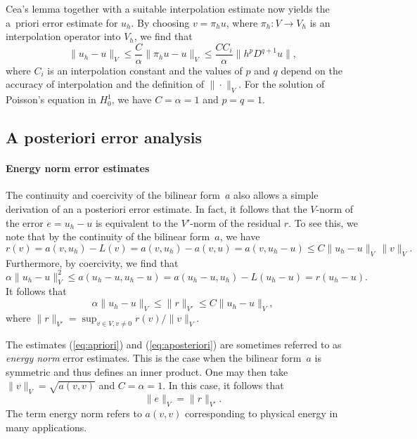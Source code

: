 Cea's lemma together with a suitable interpolation estimate now yields
the a~priori error estimate for $u_h$. By choosing $v = \pi_h u$,
where $\pi_h : V \rightarrow V_h$ is an interpolation operator into
$V_h$, we find that
\begin{equation} \label{eq:apriori}
  \|u_h - u\|_V
  \leq \frac{C}{\alpha} \|\pi_h u - u\|_V
  \leq \frac{C C_i}{\alpha} \|h^p D^{q + 1} u\|,
\end{equation}
where $C_i$ is an interpolation constant and the values of $p$ and $q$
depend on the accuracy of interpolation and the definition of
$\|\cdot\|_V$. For the solution of Poisson's equation in $H^1_0$, we
have $C = \alpha = 1$ and $p = q = 1$.

\subsection{A posteriori error analysis}

\paragraph{Energy norm error estimates}

The continuity and coercivity of the bilinear form~$a$ also allows a
simple derivation of an a posteriori error estimate.  In fact, it
follows that the $V$-norm of the error $e = u_h - u$ is equivalent to
the $V'$-norm of the residual $r$. To see this, we note that by the
continuity of the bilinear form~$a$, we have
\begin{displaymath}
  r(v)
  = a(v, u_h) - L(v) = a(v, u_h) - a(v, u) = a(v, u_h - u)
  \leq C \|u_h - u\|_V \, \|v\|_V.
\end{displaymath}
Furthermore, by coercivity, we find that
\begin{displaymath}
  \alpha \|u_h - u\|^2_V
  \leq a(u_h - u, u_h - u)
  = a(u_h - u, u_h) - L(u_h - u) = r(u_h - u).
\end{displaymath}
It follows that
\begin{equation} \label{eq:aposteriori}
  \alpha \|u_h - u\|_V \leq \|r\|_{V'} \leq C \|u_h - u\|_V,
\end{equation}
where $\|r\|_{V'} = \sup_{v \in V, v \neq 0} r(v)/ \|v\|_V$.

The estimates (\ref{eq:apriori}) and (\ref{eq:aposteriori}) are
sometimes referred to as \emph{energy norm} error estimates. This is
the case when the bilinear form~$a$ is symmetric and thus defines an
inner product. One may then take $\|v\|_V = \sqrt{a(v, v)}$ and $C =
\alpha = 1$. In this case, it follows that
\begin{equation} \label{eq:aposteriori,energynorm}
  \|e\|_V = \|r\|_{V'}.
\end{equation}
The term energy norm refers to $a(v, v)$ corresponding to physical
energy in many applications.

